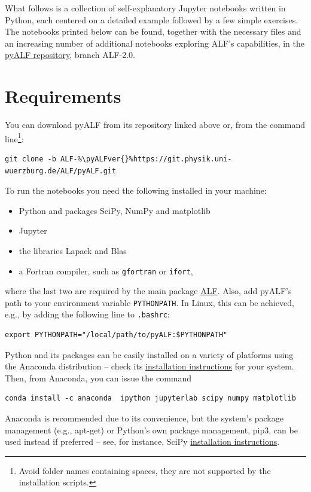 \documentclass[10pt,modern]{scrartcl}
\numberwithin{exerciseitem}{exercise} %
\newcommand{\ALFver}{2.0}    %
\newcommand{\pyALFver}{2.0}  %
\begin{document}
What follows is a collection of self-explanatory Jupyter notebooks written in Python, each centered on a detailed example followed by a few simple exercises. The notebooks printed below can be found, together with the necessary files and an increasing number of additional notebooks exploring ALF's capabilities, in the \href{https://git.physik.uni-wuerzburg.de/ALF/pyALF/-/tree/ALF-\pyALFver}{pyALF repository}, branch ALF-\pyALFver{}.


\section*{Requirements}

You can download pyALF from its repository linked above or, from the command line\footnote{Avoid folder names containing spaces, they are not supported by the installation scripts.}:
\begin{lstlisting}[style=bash,escapechar=\%]
git clone -b ALF-%\pyALFver{}%https://git.physik.uni-wuerzburg.de/ALF/pyALF.git
\end{lstlisting}
To run the notebooks you need the following installed in your machine:
\begin{itemize}
	\item Python and packages SciPy, NumPy and matplotlib
	\item Jupyter
	\item the libraries Lapack and Blas
	\item a Fortran compiler, such as \texttt{gfortran} or \texttt{ifort},
\end{itemize}
where the last two are required by the main package \href{https://git.physik.uni-wuerzburg.de/ALF/ALF/-/tree/ALF-\ALFver}{ALF}. %
Also, add pyALF's path to your environment variable \texttt{PYTHONPATH}. In Linux, this can be achieved, e.g., by adding the following line to \texttt{.bashrc}:
\begin{lstlisting}[style=bash]
export PYTHONPATH="/local/path/to/pyALF:$PYTHONPATH"
\end{lstlisting}

Python and its packages can be easily installed on a variety of platforms using the Anaconda distribution -- check its \href{https://docs.anaconda.com/anaconda/install/}{installation instructions} for your system. Then, from Anaconda, you can issue the command
\begin{lstlisting}[style=bash]
conda install -c anaconda  ipython jupyterlab scipy numpy matplotlib
\end{lstlisting}
Anaconda is recommended due to its convenience, but the system's package management (e.g., apt-get) or Python's own package management, pip3, can be used instead if preferred -- see, for instance, SciPy \href{https://www.scipy.org/install.html}{installation instructions}.
\end{document}
